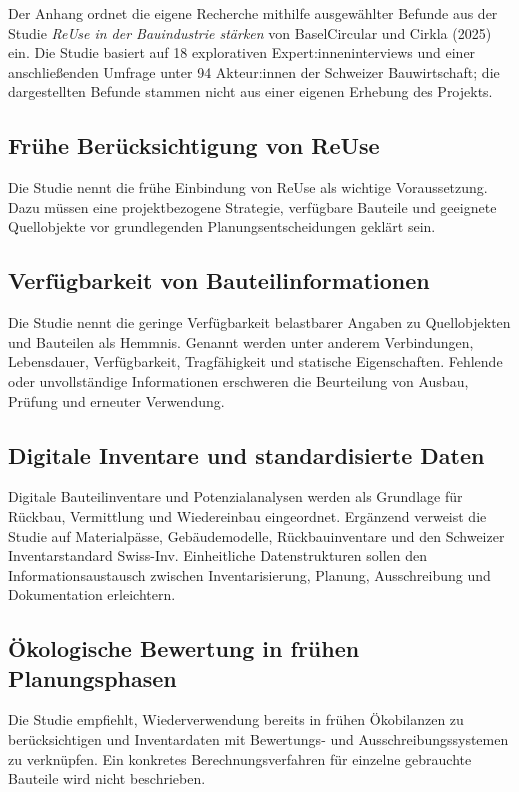 \label{anlage:sekundaerbefunde}

Der Anhang ordnet die eigene Recherche mithilfe ausgewählter Befunde aus der Studie \textit{ReUse in der Bauindustrie stärken} von BaselCircular und Cirkla (2025) \cite{baselcircular-reuse-2025} ein. Die Studie basiert auf 18 explorativen Expert:inneninterviews und einer anschließenden Umfrage unter 94 Akteur:innen der Schweizer Bauwirtschaft; die dargestellten Befunde stammen nicht aus einer eigenen Erhebung des Projekts.


\subsection{Frühe Berücksichtigung von ReUse}

Die Studie nennt die frühe Einbindung von ReUse als wichtige Voraussetzung. Dazu müssen eine projektbezogene Strategie, verfügbare Bauteile und geeignete Quellobjekte vor grundlegenden Planungsentscheidungen geklärt sein.

\subsection{Verfügbarkeit von Bauteilinformationen}

Die Studie nennt die geringe Verfügbarkeit belastbarer Angaben zu Quellobjekten und Bauteilen als Hemmnis. Genannt werden unter anderem Verbindungen, Lebensdauer, Verfügbarkeit, Tragfähigkeit und statische Eigenschaften. Fehlende oder unvollständige Informationen erschweren die Beurteilung von Ausbau, Prüfung und erneuter Verwendung.

\subsection{Digitale Inventare und standardisierte Daten}

Digitale Bauteilinventare und Potenzialanalysen werden als Grundlage für Rückbau, Vermittlung und Wiedereinbau eingeordnet. Ergänzend verweist die Studie auf Materialpässe, Gebäudemodelle, Rückbauinventare und den Schweizer Inventarstandard Swiss-Inv. Einheitliche Datenstrukturen sollen den Informationsaustausch zwischen Inventarisierung, Planung, Ausschreibung und Dokumentation erleichtern.

\subsection{Ökologische Bewertung in frühen Planungsphasen}

Die Studie empfiehlt, Wiederverwendung bereits in frühen Ökobilanzen zu berücksichtigen und Inventardaten mit Bewertungs- und Ausschreibungssystemen zu verknüpfen. Ein konkretes Berechnungsverfahren für einzelne gebrauchte Bauteile wird nicht beschrieben.

